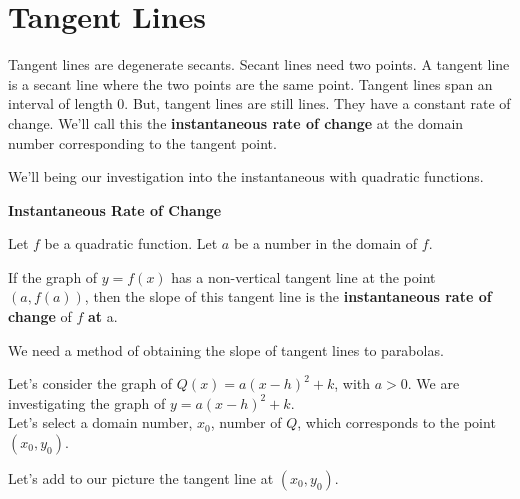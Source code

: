 \documentclass{ximera}
\begin{document}
\section{Tangent Lines}




Tangent lines are degenerate secants. Secant lines need two points.  A tangent line is a secant line where the two points are the same point. Tangent lines span an interval of length $0$.  But, tangent lines are still lines.  They have a constant rate of change. We'll call this the \textbf{instantaneous rate of change} at the domain number corresponding to the tangent point.

We'll being our investigation into the instantaneous with quadratic functions. \\


\begin{definition} \textbf{\textcolor{green!50!black}{Instantaneous Rate of Change}}  


Let $f$ be a quadratic function. Let $a$ be a number in the domain of $f$.

If the graph of $y = f(x)$ has a non-vertical tangent line at the point $(a, f(a))$, then the slope of this tangent line is the \textbf{instantaneous rate of change} of $f$ \textbf{at} a.


\end{definition}

We need a method of obtaining the slope of tangent lines to parabolas.




Let's consider the graph of $Q(x) = a (x - h)^2 + k$, with $a > 0$. We are investigating the graph of $y = a (x - h)^2 + k$. \\

Let's select a domain number, $x_0$, number of $Q$, which corresponds to the point $(x_0, y_0)$.

Let's add to our picture the tangent line at $(x_0, y_0)$.
\end{document}
